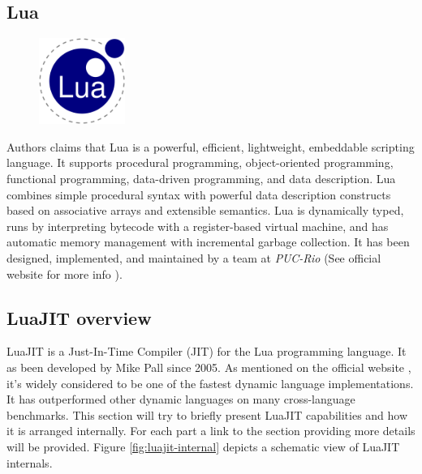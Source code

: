 


\subsection{Lua}
\label{Subsec:Lua}

\begin{figure}
    \centering
	\includegraphics[width=0.25\textwidth]{./Images/Lua.eps}
    \label{fig:lua-logo}
\end{figure}

Authors claims that Lua is a powerful, efficient, lightweight, embeddable
scripting language. It supports procedural programming, object-oriented
programming, functional programming, data-driven programming, and data
description. Lua combines simple procedural syntax with powerful data description
constructs based on associative arrays and extensible semantics. Lua is
dynamically typed, runs by interpreting bytecode with a register-based virtual
machine, and has automatic memory management with incremental garbage collection.
It has been designed, implemented, and maintained by a team at \emph{PUC-Rio}
(See official website for more info \cite{lua}).


\subsection{LuaJIT overview}
\label{Subsec:LuaJIT-overview}

LuaJIT is a Just-In-Time Compiler (JIT) for the Lua programming language. It as
been developed by Mike Pall since 2005. As mentioned on the official website
\cite{luajit-site}, it's widely considered to be one of the fastest dynamic
language implementations. It has outperformed other dynamic languages on many
cross-language benchmarks. This section will try to briefly present LuaJIT
capabilities and how it is arranged internally. For each part a link to the
section providing more details will be provided. Figure \ref{fig:luajit-internal}
depicts a schematic view of LuaJIT internals.

